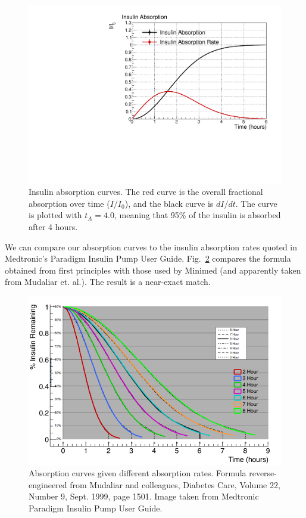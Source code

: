 \begin{figure}[htbp]
\begin{center}
\includegraphics[width=4.5in]{figures/absorption.pdf}
\caption{Insulin absorption curves. The red curve is the overall fractional absorption over time 
($I/I_0$), and the black curve is $dI/dt$. The curve is plotted with $t_A=4.0$, meaning that 95\% of 
the insulin is absorbed after 4 hours.}
\label{fig:absorption}
\end{center}
\end{figure}

We can compare our absorption curves to the insulin absorption rates quoted in Medtronic's Paradigm
Insulin Pump User Guide. Fig.~\ref{fig:absorption_compare} compares the formula obtained from first
principles with those used by Minimed (and apparently taken from Mudaliar et. al.). The result is a
near-exact match.

\begin{figure}[htbp]
\begin{center}
\includegraphics[width=4.5in]{figures/Insulin_Absorption_Comparison.png}
\caption{
Absorption curves given different absorption rates.
Formula reverse-engineered from
Mudaliar and colleagues, Diabetes Care, Volume 22, Number 9, Sept. 1999, page 1501.
Image taken from Medtronic Paradigm Insulin Pump User Guide.
}
\label{fig:absorption_compare}
\end{center}
\end{figure}

